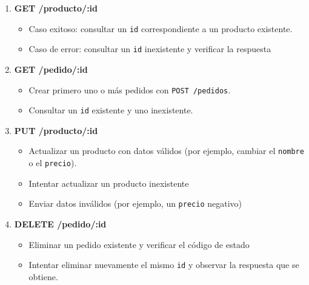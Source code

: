 \documentclass[11pt,a4paper]{article}
\begin{document}
\begin{enumerate}
	\item \textbf{GET /producto/:id}
	\begin{itemize}
		\item Caso exitoso: consultar un \texttt{id} correspondiente a un producto existente.
		\item Caso de error: consultar un \texttt{id} inexistente y verificar la respuesta %
	\end{itemize}
	\item \textbf{GET /pedido/:id}
	\begin{itemize}
		\item Crear primero uno o más pedidos con \texttt{POST /pedidos}.
		\item Consultar un \texttt{id} existente y uno inexistente.
	\end{itemize}
	\item \textbf{PUT /producto/:id}
	\begin{itemize}
		\item Actualizar un producto con datos válidos (por ejemplo, cambiar el \texttt{nombre} o el \texttt{precio}).
		\item Intentar actualizar un producto inexistente %
		\item Enviar datos inválidos (por ejemplo, un \texttt{precio} negativo) %
	\end{itemize}
	\item \textbf{DELETE /pedido/:id}
	\begin{itemize}
		\item Eliminar un pedido existente y verificar el código de estado %
		\item Intentar eliminar nuevamente el mismo \texttt{id} y observar la respuesta que se obtiene. %
	\end{itemize}
\end{enumerate}
\end{document}
